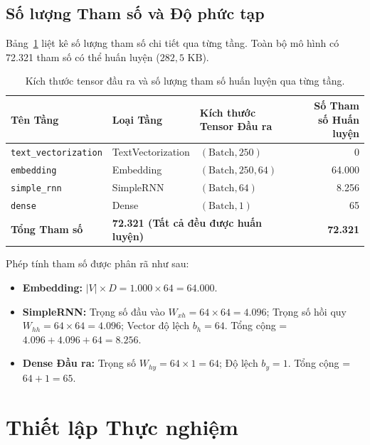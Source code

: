 \documentclass[11pt,a4paper]{article}
\begin{document}
\subsection{Số lượng Tham số và Độ phức tạp}
Bảng~\ref{tab:param_counts} liệt kê số lượng tham số chi tiết qua từng tầng. Toàn bộ mô hình có 72.321 tham số có thể huấn luyện ($282,5\text{ KB}$).

\begin{table}[H]
\centering
\begin{tabular}{lllr}
\toprule
\textbf{Tên Tầng} & \textbf{Loại Tầng} & \textbf{Kích thước Tensor Đầu ra} & \textbf{Số Tham số Huấn luyện} \\
\midrule
\texttt{text\_vectorization} & TextVectorization & $(\text{Batch}, 250)$ & 0 \\
\texttt{embedding}          & Embedding         & $(\text{Batch}, 250, 64)$ & 64.000 \\
\texttt{simple\_rnn}        & SimpleRNN         & $(\text{Batch}, 64)$ & 8.256 \\
\texttt{dense}              & Dense             & $(\text{Batch}, 1)$ & 65 \\
\midrule
\textbf{Tổng Tham số}       & \multicolumn{2}{l}{\textbf{72.321 (Tất cả đều được huấn luyện)}} & \textbf{72.321} \\
\bottomrule
\end{tabular}
\caption{Kích thước tensor đầu ra và số lượng tham số huấn luyện qua từng tầng.}
\label{tab:param_counts}
\end{table}

Phép tính tham số được phân rã như sau:
\begin{itemize}
    \item \textbf{Embedding:} $|V| \times D = 1.000 \times 64 = 64.000$.
    \item \textbf{SimpleRNN:} Trọng số đầu vào $W_{xh} = 64 \times 64 = 4.096$; Trọng số hồi quy $W_{hh} = 64 \times 64 = 4.096$; Vector độ lệch $b_h = 64$. Tổng cộng = $4.096 + 4.096 + 64 = 8.256$.
    \item \textbf{Dense Đầu ra:} Trọng số $W_{hy} = 64 \times 1 = 64$; Độ lệch $b_y = 1$. Tổng cộng = $64 + 1 = 65$.
\end{itemize}

\section{Thiết lập Thực nghiệm}
\label{sec:setup}
\end{document}
